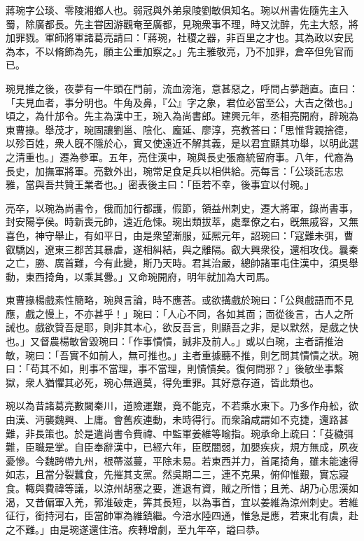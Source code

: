 \begin{pinyinscope}
 
 
 蔣琬字公琰、零陵湘鄉人也。弱冠與外弟泉陵劉敏俱知名。琬以州書佐隨先主入蜀，除廣都長。先主甞因游觀奄至廣都，見琬衆事不理，時又沈醉，先主大怒，將加罪戮。軍師將軍諸葛亮請曰：「蔣琬，社稷之器，非百里之才也。其為政以安民為本，不以脩飾為先，願主公重加察之。」先主雅敬亮，乃不加罪，倉卒但免官而已。
 
 
 
 
 琬見推之後，夜夢有一牛頭在門前，流血滂沲，意甚惡之，呼問占夢趙直。直曰：「夫見血者，事分明也。牛角及鼻，『公』字之象，君位必當至公，大吉之徵也。」頃之，為什邡令。先主為漢中王，琬入為尚書郎。建興元年，丞相亮開府，辟琬為東曹掾。舉茂才，琬固讓劉邕、陰化、龐延、廖淳，亮教荅曰：「思惟背親捨德，以殄百姓，衆人旣不隱於心，實又使遠近不解其義，是以君宜顯其功舉，以明此選之清重也。」遷為參軍。五年，亮住漢中，琬與長史張裔統留府事。八年，代裔為長史，加撫軍將軍。亮數外出，琬常足食足兵以相供給。亮每言：「公琰託志忠雅，當與吾共贊王業者也。」密表後主曰：「臣若不幸，後事宜以付琬。」
 
 
 
 
 亮卒，以琬為尚書令，俄而加行都護，假節，領益州刺史，遷大將軍，錄尚書事，封安陽亭侯。時新喪元帥，遠近危悚。琬出類拔萃，處羣僚之右，旣無戚容，又無喜色，神守舉止，有如平日，由是衆望漸服，延熈元年，詔琬曰：「寇難未弭，曹叡驕凶，遼東三郡苦其暴虐，遂相糾結，與之離隔。叡大興衆役，還相攻伐。曩秦之亡，勝、廣首難，今有此變，斯乃天時。君其治嚴，總帥諸軍屯住漢中，須吳舉動，東西掎角，以乘其釁。」又命琬開府，明年就加為大司馬。
 
 
 
 
 東曹掾楊戲素性簡略，琬與言論，時不應荅。或欲搆戲於琬曰：「公與戲語而不見應，戲之慢上，不亦甚乎！」琬曰：「人心不同，各如其靣；靣從後言，古人之所誡也。戲欲贊吾是耶，則非其本心，欲反吾言，則顯吾之非，是以默然，是戲之快也。」又督農楊敏曾毀琬曰：「作事憒憒，誠非及前人。」或以白琬，主者請推治敏，琬曰：「吾實不如前人，無可推也。」主者重據聽不推，則乞問其憒憒之狀。琬曰：「苟其不如，則事不當理，事不當理，則憒憒矣。復何問邪？」後敏坐事繫獄，衆人猶懼其必死，琬心無適莫，得免重罪。其好意存道，皆此類也。
 
 
 
 
 琬以為昔諸葛亮數闚秦川，道險運艱，竟不能克，不若乘水東下。乃多作舟舩，欲由漢、沔襲魏興、上庸。會舊疾連動，未時得行。而衆論咸謂如不克捷，還路甚難，非長策也。於是遣尚書令費禕、中監軍姜維等喻指。琬承命上疏曰：「芟穢弭難，臣職是掌。自臣奉辭漢中，已經六年，臣旣闇弱，加嬰疾疢，規方無成，夙夜憂慘。今魏跨帶九州，根蔕滋蔓，平除未易。若東西并力，首尾掎角，雖未能速得如志，且當分裂蠶食，先摧其支黨。然吳期二三，連不克果，俯仰惟艱，實忘寢食。輙與費禕等議，以涼州胡塞之要，進退有資，賊之所惜；且羌、胡乃心思漢如渴，又昔偏軍入羌，郭淮破走，筭其長短，以為事首，宜以姜維為涼州刺史。若維征行，銜持河右，臣當帥軍為維鎮繼。今涪水陸四通，惟急是應，若東北有虞，赴之不難。」由是琬遂還住涪。疾轉增劇，至九年卒，謚曰恭。
 

\end{pinyinscope}
